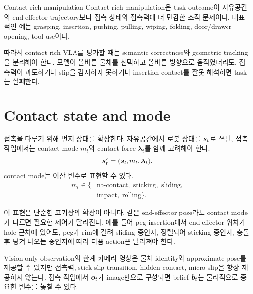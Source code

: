 \begin{definitionbox}{Contact-rich manipulation}
Contact-rich manipulation은 task outcome이 자유공간의 end-effector trajectory보다 접촉 상태와 접촉력에 더 민감한 조작 문제이다. 대표적인 예는 grasping, insertion, pushing, pulling, wiping, folding, door/drawer opening, tool use이다.
\end{definitionbox}

따라서 contact-rich VLA를 평가할 때는 semantic correctness와 geometric tracking을 분리해야 한다. 모델이 올바른 물체를 선택하고 올바른 방향으로 움직였더라도, 접촉력이 과도하거나 slip을 감지하지 못하거나 insertion contact를 잘못 해석하면 task는 실패한다.

\section{Contact state and mode}

접촉을 다루기 위해 먼저 상태를 확장한다. 자유공간에서 로봇 상태를 $\bm{s}_t$로 쓰면, 접촉 작업에서는 contact mode $m_t$와 contact force $\bm{\lambda}_t$를 함께 고려해야 한다.
\begin{equation}
  \bm{s}^{c}_t = (\bm{s}_t, m_t, \bm{\lambda}_t).
  \label{eq:contact-state}
\end{equation}
contact mode는 이산 변수로 표현할 수 있다.
\begin{equation}
  \begin{aligned}
  m_t \in \{&
  \text{no-contact},\;
  \text{sticking},\;
  \text{sliding},\\
  &
  \text{impact},\;
  \text{rolling}
  \}.
  \end{aligned}
  \label{eq:contact-mode-set}
\end{equation}

이 표현은 단순한 표기상의 확장이 아니다. 같은 end-effector pose라도 contact mode가 다르면 필요한 제어가 달라진다. 예를 들어 peg insertion에서 end-effector 위치가 hole 근처에 있어도, peg가 rim에 걸려 sliding 중인지, 정렬되어 sticking 중인지, 충돌 후 튕겨 나오는 중인지에 따라 다음 action은 달라져야 한다.

\begin{warningbox}{Vision-only observation의 한계}
카메라 영상은 물체 identity와 approximate pose를 제공할 수 있지만 접촉력, stick-slip transition, hidden contact, micro-slip을 항상 제공하지 않는다. 접촉 작업에서 $\bm{o}_t$가 image만으로 구성되면 belief $\bm{b}_t$는 물리적으로 중요한 변수를 놓칠 수 있다.
\end{warningbox}


